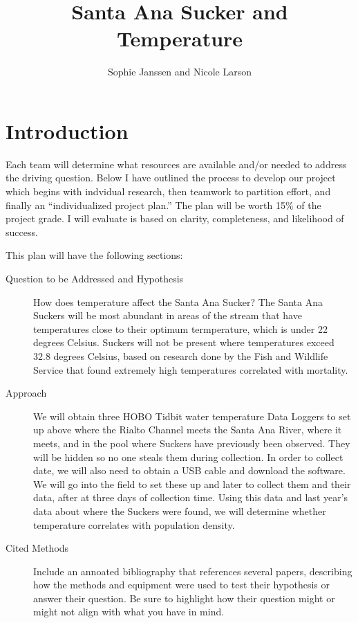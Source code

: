 \documentclass{tufte-handout}
\title{Santa Ana Sucker and Temperature}
\author{Sophie Janssen and Nicole Larson}
\begin{document}


\maketitle

\section{Introduction}

Each team will determine what resources are available and/or needed to address the driving question. Below I have outlined the process to develop our project which begins with indvidual research, then teamwork to partition effort, and finally an ``individualized project plan.'' The plan will be worth 15\% of the project grade. I will evaluate is based on clarity, completeness, and likelihood of success. 

This plan will have the following sections: 

\begin{description}
  \item[Question to be Addressed and Hypothesis] How does temperature affect the Santa Ana Sucker? The Santa Ana Suckers will be most abundant in areas of the stream that have temperatures close to their optimum termperature, which is under 22 degrees Celsius. Suckers will not be present where temperatures exceed 32.8 degrees Celsius, based on research done by the Fish and Wildlife Service that found extremely high temperatures correlated with mortality.
  \item[Approach] We will obtain three HOBO Tidbit water temperature Data Loggers to set up above where the Rialto Channel meets the Santa Ana River, where it meets, and in the pool where Suckers have previously been observed. They will be hidden so no one steals them during collection. In order to collect date, we will also need to obtain a USB cable and download the software. We will go into the field to set these up and later to collect them and their data, after at three days of collection time. Using this data and last year's data about where the Suckers were found, we will determine whether temperature correlates with population density.
  \item[Cited Methods] Include an annoated bibliography that references several papers, describing how the methods and equipment were used to test their hypothesis or answer their question. Be sure to highlight how their question might or might not align with what you have in mind.
\end{description}
\end{document}
